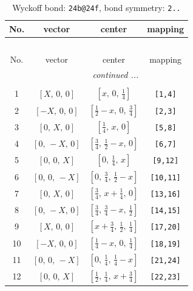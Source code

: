 \documentclass[fleqn,8pt]{jsarticle}
\begin{document}
\renewcommand{\arraystretch}{1.2}
\begin{longtable}{cccc}
\caption{Wyckoff bond: {\tt 24b@24f}, bond symmetry: {\tt 2..}}
 \\
 \hline \hline
No. & vector & center & mapping \\ \hline \endfirsthead

\multicolumn{3}{l}{\tablename\ \thetable{}} \\
 \hline \hline
No. & vector & center & mapping \\ \hline \endhead

 \hline \hline
\multicolumn{3}{r}{\footnotesize\it continued ...} \\ \endfoot

 \hline \hline
\multicolumn{3}{r}{} \\ \endlastfoot

1 & $\left[ X,\, 0,\, 0 \right]$ & $\left[ x,\, 0,\, \frac{1}{4} \right]$ & {\tt [1,4]} \\ \hline
2 & $\left[ - X,\, 0,\, 0 \right]$ & $\left[ \frac{1}{2} - x,\, 0,\, \frac{3}{4} \right]$ & {\tt [2,3]} \\ \hline
3 & $\left[ 0,\, X,\, 0 \right]$ & $\left[ \frac{1}{4},\, x,\, 0 \right]$ & {\tt [5,8]} \\ \hline
4 & $\left[ 0,\, - X,\, 0 \right]$ & $\left[ \frac{3}{4},\, \frac{1}{2} - x,\, 0 \right]$ & {\tt [6,7]} \\ \hline
5 & $\left[ 0,\, 0,\, X \right]$ & $\left[ 0,\, \frac{1}{4},\, x \right]$ & {\tt [9,12]} \\ \hline
6 & $\left[ 0,\, 0,\, - X \right]$ & $\left[ 0,\, \frac{3}{4},\, \frac{1}{2} - x \right]$ & {\tt [10,11]} \\ \hline
7 & $\left[ 0,\, X,\, 0 \right]$ & $\left[ \frac{3}{4},\, x + \frac{1}{4},\, 0 \right]$ & {\tt [13,16]} \\ \hline
8 & $\left[ 0,\, - X,\, 0 \right]$ & $\left[ \frac{3}{4},\, \frac{3}{4} - x,\, \frac{1}{2} \right]$ & {\tt [14,15]} \\ \hline
9 & $\left[ X,\, 0,\, 0 \right]$ & $\left[ x + \frac{3}{4},\, \frac{1}{2},\, \frac{1}{4} \right]$ & {\tt [17,20]} \\ \hline
10 & $\left[ - X,\, 0,\, 0 \right]$ & $\left[ \frac{1}{4} - x,\, 0,\, \frac{1}{4} \right]$ & {\tt [18,19]} \\ \hline
11 & $\left[ 0,\, 0,\, - X \right]$ & $\left[ 0,\, \frac{1}{4},\, \frac{1}{4} - x \right]$ & {\tt [21,24]} \\ \hline
12 & $\left[ 0,\, 0,\, X \right]$ & $\left[ \frac{1}{2},\, \frac{1}{4},\, x + \frac{3}{4} \right]$ & {\tt [22,23]} \\
\end{longtable}
\end{document}
